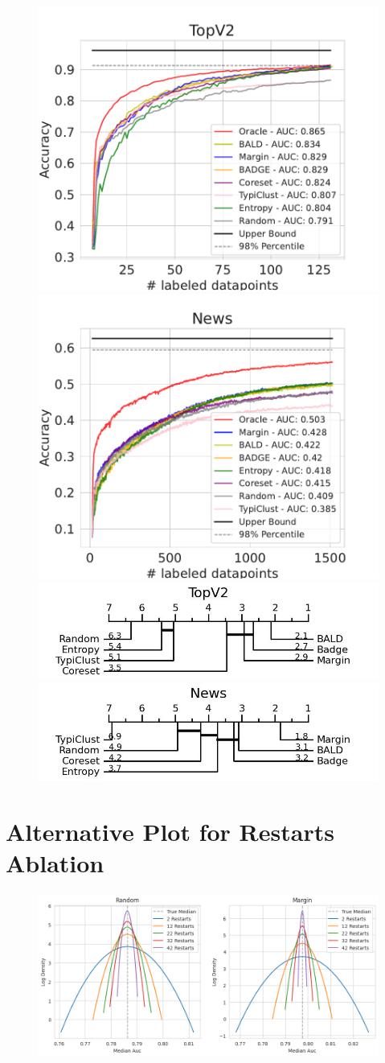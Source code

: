\documentclass[]{article}
\begin{document}
\begin{figure}[H]
\centering
\includegraphics[width=0.49\linewidth]{img/eval_topv2}
\includegraphics[width=0.49\linewidth]{img/eval_news} \\ [2mm]
\includegraphics[width=0.49\linewidth]{img/micro_topv2.jpg}
\includegraphics[width=0.49\linewidth]{img/micro_news.jpg} \\ [4mm]
\end{figure}


\section{Alternative Plot for Restarts Ablation}
\begin{figure}[H]
	\centering
	\includegraphics[width=\linewidth]{img/ablation_restarts_2}
\end{figure}
\end{document}
